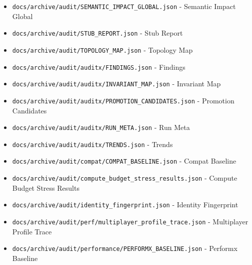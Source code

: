 \documentclass[10.5pt,a4paper,openany]{book}
\begin{document}
\begin{itemize}
\item \texttt{docs/\allowbreak{}archive/\allowbreak{}audit/\allowbreak{}SEMANTIC\_\allowbreak{}IMPACT\_\allowbreak{}GLOBAL.\allowbreak{}json} -\allowbreak{} Semantic Impact Global
\item \texttt{docs/\allowbreak{}archive/\allowbreak{}audit/\allowbreak{}STUB\_\allowbreak{}REPORT.\allowbreak{}json} -\allowbreak{} Stub Report
\item \texttt{docs/\allowbreak{}archive/\allowbreak{}audit/\allowbreak{}TOPOLOGY\_\allowbreak{}MAP.\allowbreak{}json} -\allowbreak{} Topology Map
\item \texttt{docs/\allowbreak{}archive/\allowbreak{}audit/\allowbreak{}auditx/\allowbreak{}FINDINGS.\allowbreak{}json} -\allowbreak{} Findings
\item \texttt{docs/\allowbreak{}archive/\allowbreak{}audit/\allowbreak{}auditx/\allowbreak{}INVARIANT\_\allowbreak{}MAP.\allowbreak{}json} -\allowbreak{} Invariant Map
\item \texttt{docs/\allowbreak{}archive/\allowbreak{}audit/\allowbreak{}auditx/\allowbreak{}PROMOTION\_\allowbreak{}CANDIDATES.\allowbreak{}json} -\allowbreak{} Promotion Candidates
\item \texttt{docs/\allowbreak{}archive/\allowbreak{}audit/\allowbreak{}auditx/\allowbreak{}RUN\_\allowbreak{}META.\allowbreak{}json} -\allowbreak{} Run Meta
\item \texttt{docs/\allowbreak{}archive/\allowbreak{}audit/\allowbreak{}auditx/\allowbreak{}TRENDS.\allowbreak{}json} -\allowbreak{} Trends
\item \texttt{docs/\allowbreak{}archive/\allowbreak{}audit/\allowbreak{}compat/\allowbreak{}COMPAT\_\allowbreak{}BASELINE.\allowbreak{}json} -\allowbreak{} Compat Baseline
\item \texttt{docs/\allowbreak{}archive/\allowbreak{}audit/\allowbreak{}compute\_\allowbreak{}budget\_\allowbreak{}stress\_\allowbreak{}results.\allowbreak{}json} -\allowbreak{} Compute Budget Stress Results
\item \texttt{docs/\allowbreak{}archive/\allowbreak{}audit/\allowbreak{}identity\_\allowbreak{}fingerprint.\allowbreak{}json} -\allowbreak{} Identity Fingerprint
\item \texttt{docs/\allowbreak{}archive/\allowbreak{}audit/\allowbreak{}perf/\allowbreak{}multiplayer\_\allowbreak{}profile\_\allowbreak{}trace.\allowbreak{}json} -\allowbreak{} Multiplayer Profile Trace
\item \texttt{docs/\allowbreak{}archive/\allowbreak{}audit/\allowbreak{}performance/\allowbreak{}PERFORMX\_\allowbreak{}BASELINE.\allowbreak{}json} -\allowbreak{} Performx Baseline

\end{itemize}
\end{document}
